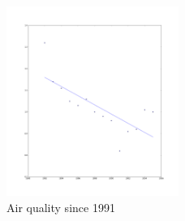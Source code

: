 \documentclass{amsart}
\begin{document}
\begin{figure}[h]
\centering
\includegraphics[width=0.5\textwidth]{img/air_quality_1991}
\caption{Air quality since 1991}
\end{figure}

\nocite{*}


\end{document}
